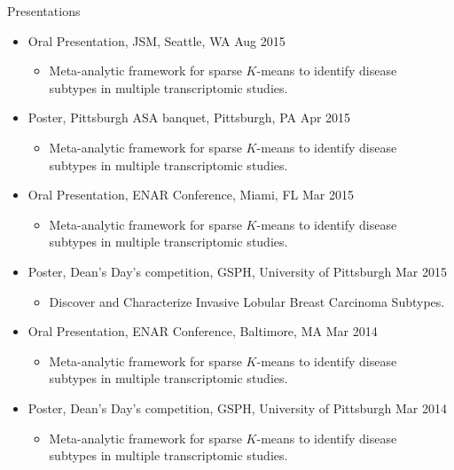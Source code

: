 \documentclass{resume} %
\begin{document}
\begin{rSection}{Presentations}
\begin{itemize}[noitemsep,topsep=0pt]
\item Oral Presentation, JSM, Seattle, WA \hfill {Aug 2015}
\begin{itemize}[noitemsep,topsep=0pt]
\item{Meta-analytic framework for sparse $K$-means to identify disease\\ subtypes in multiple transcriptomic studies.}
\end{itemize}

\item Poster, Pittsburgh ASA banquet, Pittsburgh, PA \hfill {Apr 2015}
\begin{itemize}[noitemsep,topsep=0pt]
\item{Meta-analytic framework for sparse $K$-means to identify disease\\ subtypes in multiple transcriptomic studies.}
\end{itemize}

\item Oral Presentation, ENAR Conference, Miami, FL \hfill {Mar 2015}
\begin{itemize}[noitemsep,topsep=0pt]
\item{Meta-analytic framework for sparse $K$-means to identify disease\\ subtypes in multiple transcriptomic studies.}
\end{itemize}

\item Poster, Dean's Day's competition, GSPH, University of Pittsburgh \hfill {Mar 2015}
\begin{itemize}[noitemsep,topsep=0pt]
\item{Discover and Characterize Invasive Lobular Breast Carcinoma Subtypes.}
\end{itemize}

\item Oral Presentation, ENAR Conference, Baltimore, MA \hfill {Mar 2014}
\begin{itemize}[noitemsep,topsep=0pt]
\item{Meta-analytic framework for sparse $K$-means to identify disease\\ subtypes in multiple transcriptomic studies.}
\end{itemize}

\item Poster, Dean's Day's competition, GSPH, University of Pittsburgh \hfill {Mar 2014}
\begin{itemize}[noitemsep,topsep=0pt]
\item{Meta-analytic framework for sparse $K$-means to identify disease \\ subtypes in multiple transcriptomic studies.}
\end{itemize}
\end{itemize}



\end{rSection}
\end{document}
